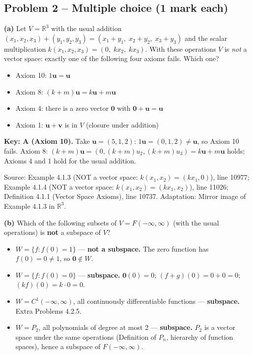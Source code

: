 \documentclass[11pt,a4paper]{article}
\newcommand{\Src}[1]{{\footnotesize\color{black!65}Source: #1}}
\begin{document}
\subsection*{Problem 2 -- Multiple choice (1 mark each)}
\textbf{(a)} Let $V=\mathbb{R}^3$ with the usual addition $(x_1,x_2,x_3)+(y_1,y_2,y_3)=(x_1+y_1,\;x_2+y_2,\;x_3+y_3)$ and the scalar multiplication $k(x_1,x_2,x_3)=(0,\;kx_2,\;kx_3)$. With these operations $V$ is \emph{not} a vector space: exactly one of the following four axioms fails. Which one?\par
\begin{itemize}[leftmargin=8mm,itemsep=0pt]\item[A$^{\ast}$] Axiom 10: $1\mathbf{u}=\mathbf{u}$\item[B] Axiom 8: $(k+m)\mathbf{u}=k\mathbf{u}+m\mathbf{u}$\item[C] Axiom 4: there is a zero vector $\mathbf{0}$ with $\mathbf{0}+\mathbf{u}=\mathbf{u}$\item[D] Axiom 1: $\mathbf{u}+\mathbf{v}$ is in $V$ (closure under addition)\end{itemize}
\textbf{Key: A (Axiom 10).} Take $\mathbf{u}=(5,1,2)$: $1\mathbf{u}=(0,1,2)\neq\mathbf{u}$, so Axiom 10 fails. Axiom 8: $(k+m)\mathbf{u}=(0,(k+m)u_2,(k+m)u_3)=k\mathbf{u}+m\mathbf{u}$ holds; Axioms 4 and 1 hold for the usual addition.\par
\Src{Example 4.1.3 (NOT a vector space: $k(x_1,x_2)=(kx_1,0)$), line 10977; Example 4.1.4 (NOT a vector space: $k(x_1,x_2)=(kx_1,x_2)$), line 11026; Definition 4.1.1 (Vector Space Axioms), line 10737. Adaptation: Mirror image of Example 4.1.3 in $\mathbb{R}^3$.}\par
\textbf{(b)} Which of the following subsets of $V=F(-\infty,\infty)$ (with the usual operations) is \textbf{not} a subspace of $V$?\par
\begin{itemize}[leftmargin=8mm,itemsep=0pt]\item[A$^{\ast}$] $W=\{f : f(0)=1\}$ --- \textbf{not a subspace.} The zero function has $f(0)=0\neq1$, so $\mathbf{0}\notin W$.\item[B] $W=\{f : f(0)=0\}$ --- \textbf{subspace.} $\mathbf{0}(0)=0$; $(f+g)(0)=0+0=0$; $(kf)(0)=k\cdot0=0$.\item[C] $W=C^1(-\infty,\infty)$, all continuously differentiable functions --- \textbf{subspace.} Extra Problems 4.2.5.\item[D] $W=P_2$, all polynomials of degree at most 2 --- \textbf{subspace.} $P_2$ is a vector space under the same operations (Definition of $P_n$, hierarchy of function spaces), hence a subspace of $F(-\infty,\infty)$.\end{itemize}
\end{document}
